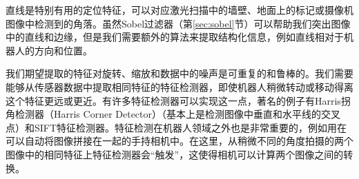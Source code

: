 
直线是特别有用的定位特征，可以对应激光扫描中的墙壁、地面上的标记或摄像机图像中检测到的角落。虽然Sobel过滤器（第\ref{sec:sobel}节）可以帮助我们突出图像中的直线和边缘，但是我们需要额外的算法来提取结构化信息，例如直线相对于机器人的方向和位置。


我们期望提取的特征对旋转、缩放和数据中的噪声是可重复的和鲁棒的。我们需要能够从传感器数据中提取相同特征的特征检测器，即使机器人稍微转动或移动得离这个特征更远或更近。有许多特征检测器可以实现这一点，著名的例子有Harris拐角检测器（Harris Corner Detector）（基本上是检测图像中垂直和水平线的交叉点）和SIFT特征检测器。特征检测在机器人领域之外也是非常重要的，例如用在可以自动将图像拼接在一起的手持相机中。在这里，从稍微不同的角度拍摄的两个图像中的相同特征上特征检测器会“触发”，这使得相机可以计算两个图像之间的转换。


